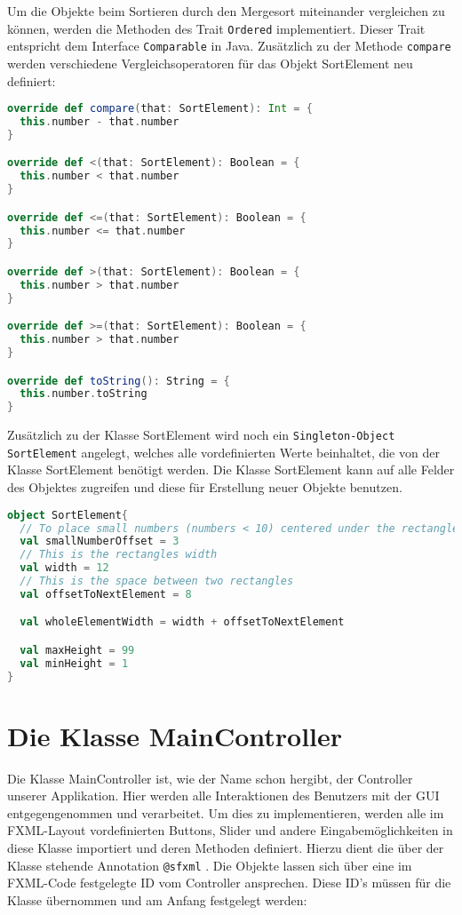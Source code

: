 Um die Objekte beim Sortieren durch den Mergesort miteinander vergleichen zu können, werden die Methoden des Trait \texttt{Ordered} implementiert. Dieser Trait entspricht dem Interface \texttt{Comparable} in Java. Zusätzlich zu der Methode \texttt{compare} werden verschiedene Vergleichsoperatoren für das Objekt SortElement neu definiert:

\begin{lstlisting}[language=Scala,caption=Überschriebene Methoden]
override def compare(that: SortElement): Int = {
  this.number - that.number
}

override def <(that: SortElement): Boolean = {
  this.number < that.number
}

override def <=(that: SortElement): Boolean = {
  this.number <= that.number
}

override def >(that: SortElement): Boolean = {
  this.number > that.number
}

override def >=(that: SortElement): Boolean = {
  this.number > that.number
}

override def toString(): String = {
  this.number.toString
}
\end{lstlisting}

Zusätzlich zu der Klasse SortElement wird noch ein \texttt{Singleton-Object} \texttt{SortElement} angelegt, welches alle vordefinierten Werte beinhaltet, die von der Klasse SortElement benötigt werden. Die Klasse SortElement kann auf alle Felder des Objektes zugreifen und diese für Erstellung neuer Objekte benutzen.

\begin{lstlisting}[language=Scala,caption=Das Singleton--Object SortElement]
object SortElement{
  // To place small numbers (numbers < 10) centered under the rectangle, this offset is needed.
  val smallNumberOffset = 3
  // This is the rectangles width
  val width = 12
  // This is the space between two rectangles
  val offsetToNextElement = 8

  val wholeElementWidth = width + offsetToNextElement

  val maxHeight = 99
  val minHeight = 1
}
\end{lstlisting}

\section{Die Klasse MainController}

Die Klasse MainController ist, wie der Name schon hergibt, der Controller unserer Applikation. Hier werden alle Interaktionen des Benutzers mit der GUI entgegengenommen und verarbeitet. Um dies zu implementieren, werden alle im FXML-Layout vordefinierten Buttons, Slider und andere Eingabemöglichkeiten in diese Klasse importiert und deren Methoden definiert. Hierzu dient die über der Klasse stehende Annotation \texttt{@sfxml} . Die Objekte lassen sich über eine im FXML-Code festgelegte ID vom Controller ansprechen. Diese ID’s müssen für die Klasse übernommen und am Anfang festgelegt werden:


